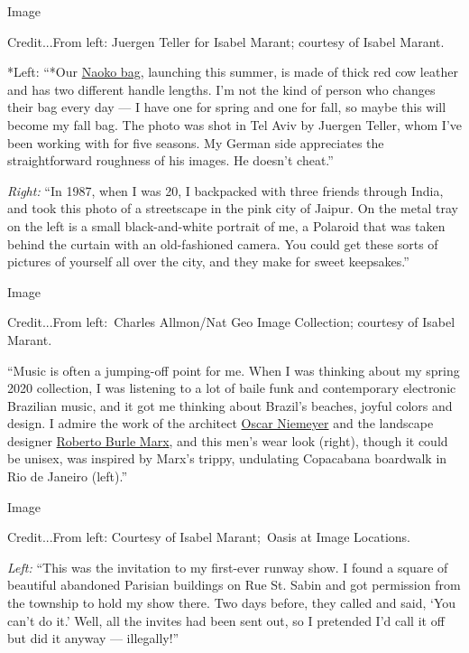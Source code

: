 Image

Credit...From left: Juergen Teller for Isabel Marant; courtesy of Isabel
Marant.

*Left: ``*Our
\href{https://www.isabelmarant.com/us/isabel-marant/women/naoko}{Naoko
bag}, launching this summer, is made of thick red cow leather and has
two different handle lengths. I'm not the kind of person who changes
their bag every day --- I have one for spring and one for fall, so maybe
this will become my fall bag. The photo was shot in Tel Aviv by Juergen
Teller, whom I've been working with for five seasons. My German side
appreciates the straightforward roughness of his images. He doesn't
cheat.''

\emph{Right:} ``In 1987, when I was 20, I backpacked with three friends
through India, and took this photo of a streetscape in the pink city of
Jaipur. On the metal tray on the left is a small black-and-white
portrait of me, a Polaroid that was taken behind the curtain with an
old-fashioned camera. You could get these sorts of pictures of yourself
all over the city, and they make for sweet keepsakes.''

Image

Credit...From left:~Charles Allmon/Nat Geo Image Collection; courtesy of
Isabel Marant.

``Music is often a jumping-off point for me. When I was thinking about
my spring 2020 collection, I was listening to a lot of baile funk and
contemporary electronic Brazilian music, and it got me thinking about
Brazil's beaches, joyful colors and design. I admire the work of the
architect
\href{https://www.nytimes3xbfgragh.onion/2018/08/17/t-magazine/niemeyer-house-adriana-varejao.html}{Oscar
Niemeyer} and the landscape designer
\href{https://www.nytimes3xbfgragh.onion/2019/06/20/arts/design/roberto-burle-marx-botanical-garden.html}{Roberto
Burle Marx}, and this men's wear look (right), though it could be
unisex, was inspired by Marx's trippy, undulating Copacabana boardwalk
in Rio de Janeiro (left).''

Image

Credit...From left: Courtesy of Isabel Marant;~Oasis at Image Locations.

\emph{Left:} ``This was the invitation to my first-ever runway show. I
found a square of beautiful abandoned Parisian buildings on Rue St.
Sabin and got permission from the township to hold my show there. Two
days before, they called and said, `You can't do it.' Well, all the
invites had been sent out, so I pretended I'd call it off but did it
anyway --- illegally!''

